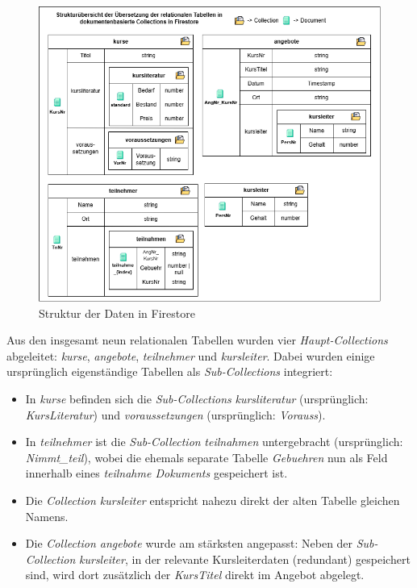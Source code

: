 \documentclass[12pt,a4paper%
              ,oneside     %
              ,titlepage
              ,DIV=13
              ,headinclude
              ,footinclude=false%
              ,cleardoublepage=empty%
              ,parskip=half,
              BCOR=0mm,
              ]{scrreprt}
\begin{document}
\begin{figure}[H]
	\centering
	\includegraphics[width=\dimexpr0.9\linewidth]{img/StrukturFirestore.png}
	\caption{Struktur der Daten in Firestore}
	\label{fig:structure}
\end{figure}

Aus den insgesamt neun relationalen Tabellen wurden vier \textit{Haupt-Collections} abgeleitet: \textit{kurse}, \textit{angebote}, \textit{teilnehmer} und \textit{kursleiter}. Dabei wurden einige ursprünglich eigenständige Tabellen als \textit{Sub-Collections} integriert:

\begin{itemize}
	\item In \textit{kurse} befinden sich die \textit{Sub-Collections} \textit{kursliteratur} (ursprünglich: \textit{KursLiteratur}) und \textit{voraussetzungen} (ursprünglich: \textit{Vorauss}).
	\item In \textit{teilnehmer} ist die \textit{Sub-Collection} \textit{teilnahmen} untergebracht (ursprünglich: \textit{Nimmt\_teil}), wobei die ehemals separate Tabelle \textit{Gebuehren} nun als Feld innerhalb eines \textit{teilnahme Dokuments} gespeichert ist.
	\item Die \textit{Collection kursleiter} entspricht nahezu direkt der alten Tabelle gleichen Namens.
	\item Die \textit{Collection angebote} wurde am stärksten angepasst: Neben der \textit{Sub-Collection} \textit{kursleiter}, in der relevante Kursleiterdaten (redundant) gespeichert sind, wird dort zusätzlich der \textit{KursTitel} direkt im Angebot abgelegt.
\end{itemize}
\end{document}
